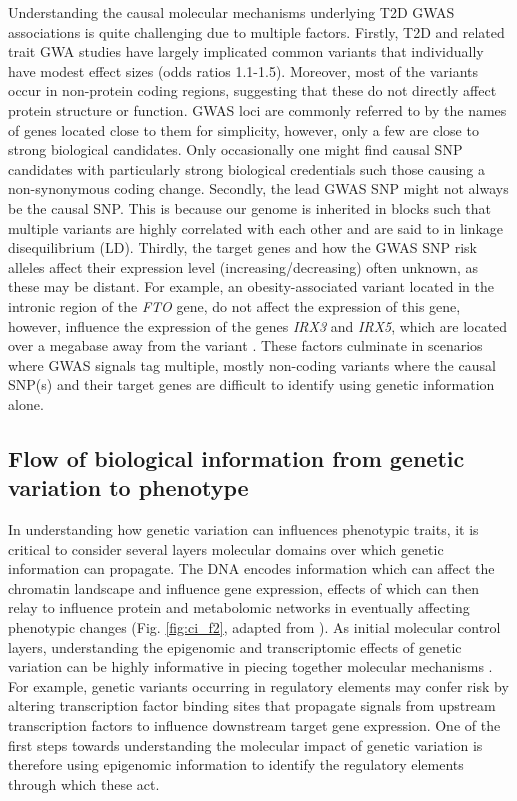 Understanding the causal molecular mechanisms underlying T2D GWAS associations is quite challenging due to multiple factors. Firstly, T2D and related trait GWA studies have largely implicated common variants that individually have modest effect sizes (odds ratios 1.1-1.5). Moreover, most of the variants occur in non-protein coding regions, suggesting that these do not directly affect protein structure or function. GWAS loci are commonly referred to by the names of genes located close to them for simplicity, however, only a few are close to strong biological candidates. Only occasionally one might find causal SNP candidates with particularly strong biological credentials such those causing a non-synonymous coding change.  Secondly, the lead GWAS SNP might not always be the causal SNP. This is because our genome is inherited in blocks such that multiple variants are highly correlated with each other and are said to in linkage disequilibrium (LD). Thirdly, the target genes and how the GWAS SNP risk alleles affect their expression level (increasing/decreasing) often unknown, as these may be distant. For example, an obesity-associated variant located in the intronic region of the \textit{FTO} gene, do not affect the expression of this gene, however, influence the expression of the genes \textit{IRX3} and \textit{IRX5}, which are located over a megabase away from the variant \cite{claussnitzerFTOObesityVariant2015}. These factors culminate in scenarios where GWAS signals tag multiple, mostly non-coding variants where the causal SNP(s) and their target genes are difficult to identify using genetic information alone.    
                                                                             
\subsection{Flow of biological information from genetic variation to phenotype} 
In understanding how genetic variation can influences phenotypic traits, it is critical to consider several layers molecular domains over which genetic information can propagate. The DNA encodes information which can affect the chromatin landscape and influence gene expression, effects of which can then relay to influence protein and metabolomic networks in eventually affecting phenotypic changes (Fig. \ref{fig:ci_f2}, adapted from \cite{civelekSystemsGeneticsApproaches2014}). As initial molecular control layers, understanding the epigenomic and transcriptomic effects of genetic variation can be highly informative in piecing together molecular mechanisms \cite{kyonoGenomicAnnotationDiseaseassociated2019}. For example, genetic variants occurring in regulatory elements may confer risk by altering transcription factor binding sites that propagate signals from upstream transcription factors to influence downstream target gene expression. One of the first steps towards understanding the molecular impact of genetic variation is therefore using epigenomic information to identify the regulatory elements through which these act. 


